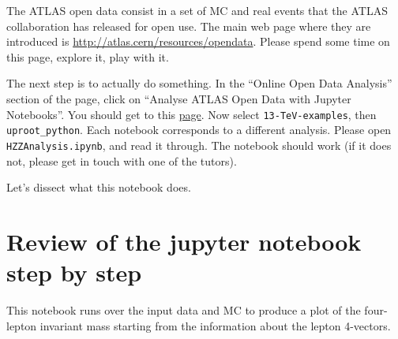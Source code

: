 
The ATLAS open data consist in a set of MC and real events that the ATLAS collaboration has released for open use. The main web page where they are introduced is \url{http://atlas.cern/resources/opendata}. Please spend some time on this page, explore it, play with it.

The next step is to actually do something. In the ``Online Open Data Analysis'' section of the page, click on ``Analyse ATLAS Open Data with Jupyter Notebooks''. You should get to this \href{https://mybinder.org/v2/gh/atlas-outreach-data-tools/notebooks-collection-opendata/master/}{page}. Now select \verb|13-TeV-examples|, then \verb|uproot_python|. Each notebook corresponds to a different analysis. Please open \verb|HZZAnalysis.ipynb|, and read it through. The notebook should work (if it does not, please get in touch with one of the tutors). 

Let's dissect what this notebook does. 

\section{Review of the jupyter notebook step by step}
\label{sec:review_notebook}

This notebook runs over the input data and MC to produce a plot of the four-lepton invariant mass starting from the information about the lepton 4-vectors. 

